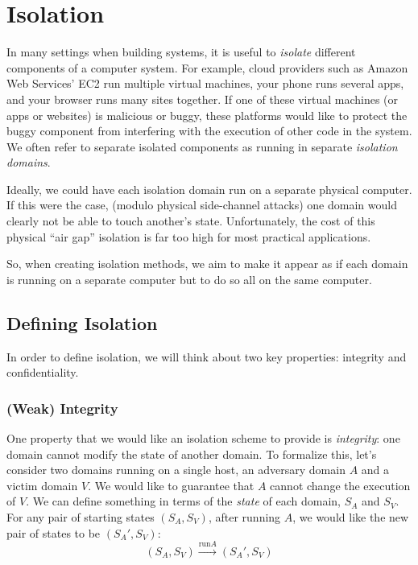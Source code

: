 \chapter{Isolation}

In many settings when building systems, it is
useful to \emph{isolate} different components of
a computer system.
For example, cloud providers such as Amazon Web Services' EC2 run multiple virtual machines,
your phone runs several apps, and your browser runs many sites together. 
If one of these virtual machines (or apps or websites) 
is malicious or buggy, these platforms would like to protect the buggy
component from interfering with the execution of other code in the system. 
We often refer to separate isolated components as running in
separate \emph{isolation domains}.

Ideally, we could have each isolation domain run on a
separate physical computer.
If this were the case, (modulo physical side-channel attacks)
one domain would clearly not be able to touch another's state.
Unfortunately, the cost of this physical ``air gap'' isolation is 
far too high for most practical applications.



So, when creating isolation methods, we aim to make it appear as if each domain is running on a separate computer but to do so all on the same computer.

\section{Defining Isolation}
In order to define isolation, we will think about two key properties: integrity and confidentiality.

\subsection{(Weak) Integrity}
One property that we would like an isolation scheme
to provide is \emph{integrity}:
one domain cannot modify the state of another
domain. To formalize this, let's consider two
domains running on a single host, an adversary
domain $A$ and a victim domain $V$. We would like
to guarantee that $A$ cannot change the execution
of $V$. We can define something in terms of the
\emph{state} of each domain, $S_A$ and $S_V$. For
any pair of starting states $(S_A, S_V)$, after
running $A$, we would like the new pair of states
to be $(S_A', S_V)$:
\[ (S_A, S_V) \xrightarrow{\text{run} A} (S_A', S_V) \]

